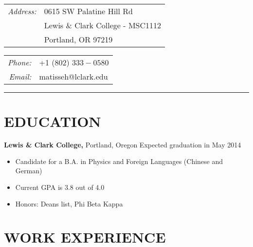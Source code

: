 \documentclass{res} %
\begin{document}

\begin{resume}

\sectionwidth=0pt

\partopsep 0pt
\parsep 0.5pt
\parskip 8pt
\itemsep 0pt
\parindent 7pt

\begin{multicols}{2}

\begin{tabular}{r l}
{\it Address:} & 0615 SW Palatine Hill Rd \\
& Lewis \& Clark College - MSC1112 \\
& Portland, OR 97219 \\
\end{tabular}

\columnbreak

\begin{tabular}{r l}
{\it Phone:} & +1 (802) $333-0580$ \\
{\it Email:} & matisseh@lclark.edu
\end{tabular}

\end{multicols}

\hrule width 7in height 1pt

\section{EDUCATION}

{\bf Lewis \& Clark College,} Portland, Oregon \hfill Expected graduation in May 2014 %
\begin{itemize}[label={--}]
	\item Candidate for a B.A. in Physics and Foreign Languages (Chinese and German)
	\item Current GPA is 3.8 out of 4.0
	\item Honors: Deans list, Phi Beta Kappa
\end{itemize}


\section{WORK EXPERIENCE}


\end{resume}
\end{document}

